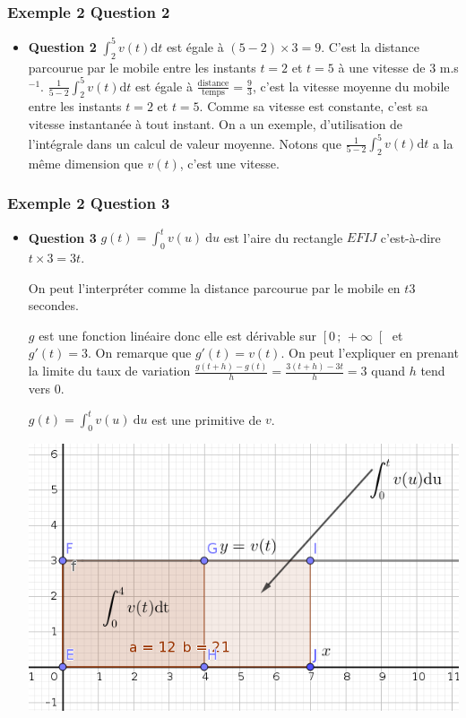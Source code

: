 \documentclass[11pt, hyperref={urlcolor=red,%
            linkcolor=blue, %
            colorlinks=true}]{beamer}
\newcommand{\Interfo}[2]{\left[#1\, ;\, #2\right[}
\newcommand{\dt}{\ensuremath{\text{d}t}}		%
\newcommand{\du}{\ensuremath{\text{d}u}}		%
\newcommand{\integraleu}[3]{\int_{#1}^{#2} #3 \ \du}
\begin{document}
\begin{frame}
\frametitle{Exemple 2 Question 2}


\begin{itemize}

\item \textbf{Question 2}  $\int_{2}^{5}v(t)\dt$ est égale à $(5 - 2) \times 3 = 9$. C'est la distance parcourue par le mobile entre les instants $t=2$ et $t=5$ à une vitesse de $3$ m.s$^{-1}$. $\frac{1}{5-2}\int_{2}^{5}v(t)\dt$ est égale à $\frac{\text{distance}}{\text{temps}}=\frac{9}{3}$, c'est la vitesse moyenne du mobile entre les instants $t=2$ et $t=5$. Comme sa vitesse est constante, c'est sa vitesse instantanée à tout instant. On a un exemple, d'utilisation de l'intégrale dans un calcul de valeur moyenne. Notons que $\frac{1}{5-2}\int_{2}^{5}v(t)\dt$ a la même dimension que $v(t)$, c'est une vitesse.
\end{itemize}



\end{frame}



\begin{frame}
\frametitle{Exemple 2 Question 3}


\begin{itemize}

\item \textbf{Question 3}  $g(t)=\integraleu{0}{t}{v(u)}$ est l'aire du rectangle $EFIJ$ c'est-à-dire $t \times 3 = 3t$.

On peut l'interpréter comme la distance parcourue par le mobile en $t3$ secondes. 

$g$ est une fonction linéaire donc elle est dérivable sur $\Interfo{0}{+\infty}$ et $g'(t)=3$.  On remarque que $g'(t)=v(t)$. On peut l'expliquer en prenant  la limite du taux de variation  $\frac{g(t+h)-g(t)}{h} = \frac{3(t+h)-3t}{h}=3$ quand $h$ tend vers $0$.

 $g(t)=\integraleu{0}{t}{v(u)}$ est une primitive de $v$.

\begin{center}
\includegraphics[scale=0.2]{images/exemple2.png}
\end{center}


\end{itemize}



\end{frame}
\end{document}
